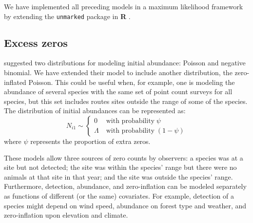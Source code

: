 \documentclass[12pt]{article}
\begin{document}
We have implemented all preceding models in
a maximum likelihood framework by extending the
\texttt{unmarked} package
\citep{fiske_chandler:2011} in \textbf{R} \citep{R-2012}.


\subsection{Excess zeros}

\citet{dail_madsen:2011} suggested two distributions for
modeling
initial abundance: Poisson and negative binomial. We have
extended
their model to include another distribution, the zero-inflated
Poisson. This could be useful when, for example, one is modeling
the
abundance of several species with the same set of point
count surveys for all species, but this set includes routes
sites
outside the range of some of the species. The distribution
of
initial abundances can be represented as:
\begin{equation}
N_{i1} \sim \left\{
\begin{aligned}
0 &\; \text{with probability} \; \psi \\
\Lambda &\; \text{with probability} \; (1-\psi)
\end{aligned} \right.
\label{eq:ZIP}
\end{equation}
where $\psi$ represents the proportion of extra zeros.

These models allow three sources of zero counts by observers: a
species was at a site but not detected; the site was within the
species' range but there were no animals at that site in that
year; and the site was outside the species' range. Furthermore,
detection, abundance, and zero-inflation can be modeled separately as
functions of different (or the same) covariates. For example, detection of a
species might depend on wind speed,
abundance on forest type and weather, and zero-inflation upon elevation and
climate.  

\end{document}
